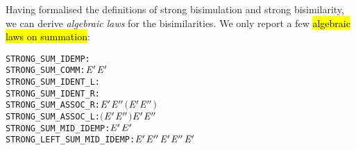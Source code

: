 Having formalised the definitions of strong bisimulation and strong bisimilarity,
we can derive \emph{algebraic laws} for the 
 bisimilarities. We only report a few \hl{algebraic laws on summation}:
\begin{alltt}
STRONG_SUM_IDEMP:          \HOLTokenTurnstile{}  \HOLSymConst{\ensuremath{+}}  \HOLSymConst{\HOLTokenStrongEQ}   
STRONG_SUM_COMM:           \HOLTokenTurnstile{}  \HOLSymConst{\ensuremath{+}} \ensuremath{\HOLFreeVar{E}\sp{\prime}} \HOLSymConst{\HOLTokenStrongEQ} \ensuremath{\HOLFreeVar{E}\sp{\prime}} \HOLSymConst{\ensuremath{+}} 
STRONG_SUM_IDENT_L:        \HOLTokenTurnstile{}  \HOLSymConst{\ensuremath{+}}  \HOLSymConst{\HOLTokenStrongEQ} 
STRONG_SUM_IDENT_R:        \HOLTokenTurnstile{}  \HOLSymConst{\ensuremath{+}}  \HOLSymConst{\HOLTokenStrongEQ} 
STRONG_SUM_ASSOC_R:        \HOLTokenTurnstile{}  \HOLSymConst{\ensuremath{+}} \ensuremath{\HOLFreeVar{E}\sp{\prime}} \HOLSymConst{\ensuremath{+}} \ensuremath{\HOLFreeVar{E}\sp{\prime\prime}} \HOLSymConst{\HOLTokenStrongEQ}  \HOLSymConst{\ensuremath{+}} \ensuremath{(}\ensuremath{\HOLFreeVar{E}\sp{\prime}} \HOLSymConst{\ensuremath{+}} \ensuremath{\HOLFreeVar{E}\sp{\prime\prime}}\ensuremath{)}
STRONG_SUM_ASSOC_L:        \HOLTokenTurnstile{}  \HOLSymConst{\ensuremath{+}} \ensuremath{(}\ensuremath{\HOLFreeVar{E}\sp{\prime}} \HOLSymConst{\ensuremath{+}} \ensuremath{\HOLFreeVar{E}\sp{\prime\prime}}\ensuremath{)} \HOLSymConst{\HOLTokenStrongEQ}  \HOLSymConst{\ensuremath{+}} \ensuremath{\HOLFreeVar{E}\sp{\prime}} \HOLSymConst{\ensuremath{+}} \ensuremath{\HOLFreeVar{E}\sp{\prime\prime}}
STRONG_SUM_MID_IDEMP:      \HOLTokenTurnstile{}  \HOLSymConst{\ensuremath{+}} \ensuremath{\HOLFreeVar{E}\sp{\prime}} \HOLSymConst{\ensuremath{+}}  \HOLSymConst{\HOLTokenStrongEQ} \ensuremath{\HOLFreeVar{E}\sp{\prime}} \HOLSymConst{\ensuremath{+}} 
STRONG_LEFT_SUM_MID_IDEMP: \HOLTokenTurnstile{}  \HOLSymConst{\ensuremath{+}} \ensuremath{\HOLFreeVar{E}\sp{\prime}} \HOLSymConst{\ensuremath{+}} \ensuremath{\HOLFreeVar{E}\sp{\prime\prime}} \HOLSymConst{\ensuremath{+}} \ensuremath{\HOLFreeVar{E}\sp{\prime}} \HOLSymConst{\HOLTokenStrongEQ}  \HOLSymConst{\ensuremath{+}} \ensuremath{\HOLFreeVar{E}\sp{\prime\prime}} \HOLSymConst{\ensuremath{+}} \ensuremath{\HOLFreeVar{E}\sp{\prime}}
\end{alltt}

